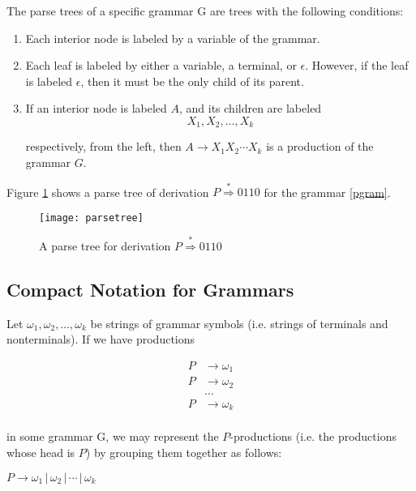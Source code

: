 \documentclass[a4paper,oneside,11pt]{book}
\theoremstyle{definition}
\begin{document}
The parse trees of a specific grammar G are trees with the following conditions:

\begin{enumerate}
\item
Each interior node is labeled by a variable of the grammar.

\item
Each leaf is labeled by either a variable, a terminal, or $\epsilon$.
However, if the leaf is labeled $\epsilon$, then it must be the only child of its parent.

\item
If an interior node is labeled $A$, and its children are labeled
$$X_1, X_2, \ldots, X_k$$

respectively, from the left, then $A \rightarrow X_1 X_2 \cdots X_k$ is a production of the grammar $G$.
\end{enumerate}

Figure \ref{fig:parsetree} shows a parse tree of derivation $P \overset{*}{\Rightarrow} 0110$ for the
grammar \ref{pgram}.

\begin{figure}[htb]
\caption{A parse tree for derivation $P \overset{*}{\Rightarrow} 0110$ }
\label{fig:parsetree}
\vspace{0.5cm}
\begin{center}
\texttt{[image: parsetree]}
\end{center}
\end{figure}

\subsection{Compact Notation for Grammars}

Let $\omega_1, \omega_2, \ldots, \omega_k$ be strings of grammar symbols (i.e. strings of terminals and nonterminals).
If we have productions

\begin{align*}
P &\rightarrow \omega_1\\
P &\rightarrow \omega_2\\
&\ldots\\
P &\rightarrow \omega_k\\
\end{align*}

in some grammar G, we may represent the $P$-productions (i.e. the productions whose head is $P$) by grouping them together as follows:

\begin{flushleft}
$P \rightarrow \omega_1\, | \, \omega_2 \, | \, \cdots \, | \, \omega_k$
\end{flushleft}
\end{document}
